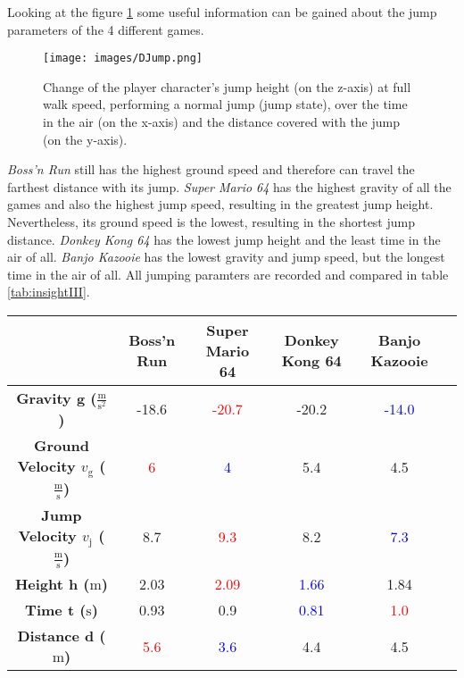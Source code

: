\documentclass[letterpaper, 10 pt, conference]{ieeeconf}  %
\begin{document}
Looking at the figure \ref{fig:jump} some useful information can be gained about the jump parameters of the 4 different games.

\begin{figure}[!ht]
    \caption{ Change of the player character's jump height (on the z-axis) at full walk speed, performing a normal jump (jump state), over the time in the air (on the x-axis) and the distance covered with the jump (on the y-axis).}
    \centering
    \texttt{[image: images/DJump.png]}
    \label{fig:jump}
\end{figure}

\textit{Boss'n Run} still has the highest ground speed and therefore can travel the farthest distance with its jump.
\textit{Super Mario 64} has the highest gravity of all the games and also the highest jump speed, resulting in the greatest jump height. Nevertheless, its ground speed is the lowest, resulting in the shortest jump distance.
\textit{Donkey Kong 64} has the lowest jump height and the least time in the air of all.
\textit{Banjo Kazooie} has the lowest gravity and jump speed, but the longest time in the air of all.
All jumping paramters are recorded and compared in table \ref{tab:insightIII}.

\begin{table*}[htbp]
    \centering
    \begin{tabular}{cccccc}
    \toprule
     & \textbf{Boss'n Run} & \textbf{Super Mario 64} & \textbf{Donkey Kong 64} & \textbf{Banjo Kazooie} \\
    \midrule
    \textbf{Gravity g ($\frac{\mathrm{m}}{\mathrm{s^2}}$)} & -18.6 & \textcolor{red}{-20.7} & -20.2 & \textcolor{blue}{-14.0} \\
    \textbf{Ground Velocity $v_{\text{g}}$ ($\frac{\mathrm{m}}{\mathrm{s}}$)} & \textcolor{red}{6} & \textcolor{blue}{4} & 5.4 & 4.5 \\
    \textbf{Jump Velocity $v_{\text{j}}$ ($\frac{\mathrm{m}}{\mathrm{s}}$)} & 8.7 & \textcolor{red}{9.3} & 8.2 & \textcolor{blue}{7.3} \\
    \textbf{Height h ($\mathrm{m}$)} & 2.03 & \textcolor{red}{2.09} & \textcolor{blue}{1.66} & 1.84 \\
    \textbf{Time t ($\mathrm{s}$)} & 0.93 & 0.9 & \textcolor{blue}{0.81} & \textcolor{red}{1.0} \\
    \textbf{Distance d ($\mathrm{m}$)} & \textcolor{red}{5.6} & \textcolor{blue}{3.6} & 4.4 & 4.5 \\
    \bottomrule
    \end{tabular}
    \caption{Default jump parameters of the 4 games Boss'n Run, Super Mario 64, Donkey Kong 64 and Banjo Kazooie.
    For all parameters, the highest values are marked in red and the lowest in blue.}
    \label{tab:insightIII}
\end{table*}
\end{document}

